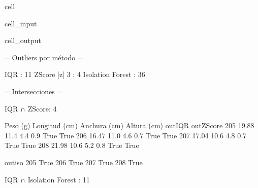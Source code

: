 \documentclass[a4paper,10pt,spanish]{jupyterBook}
\begin{document}
\begin{sphinxuseclass}{cell}
\begin{sphinxVerbatimInput}
\begin{sphinxuseclass}{cell_input}
\begin{sphinxVerbatim}[commandchars=\\\{\}]
\PYG{p}{[}\PYG{p}{[}\PYG{p}{]}\PYG{p}{]}
\end{sphinxVerbatim}

\end{sphinxuseclass}\end{sphinxVerbatimInput}
\begin{sphinxVerbatimOutput}

\begin{sphinxuseclass}{cell_output}
\begin{sphinxVerbatim}[commandchars=\\\{\}]
─ Outliers por método ─

IQR                : 11
Z\PYGZhy{}Score |z| \PYGZgt{} 3    : 4
Isolation Forest   : 36

─ Intersecciones ─

IQR ∩ Z\PYGZhy{}Score: 4
\end{sphinxVerbatim}

\begin{sphinxVerbatim}[commandchars=\\\{\}]
     Peso (g)  Longitud (cm)  Anchura (cm)  Altura (cm)  out\PYGZus{}IQR  out\PYGZus{}ZScore  \PYGZbs{}
205     19.88           11.4           4.4          0.9     True        True
206     16.47           11.0           4.6          0.7     True        True
207     17.04           10.6           4.8          0.7     True        True
208     21.98           10.6           5.2          0.8     True        True

     out\PYGZus{}iso
205     True
206     True
207     True
208     True
\end{sphinxVerbatim}

\begin{sphinxVerbatim}[commandchars=\\\{\}]
IQR ∩ Isolation Forest     : 11
\end{sphinxVerbatim}


\end{sphinxuseclass}
\end{sphinxVerbatimOutput}
\end{sphinxuseclass}
\end{document}
